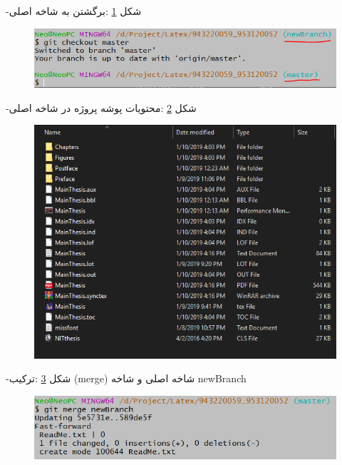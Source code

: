 -شکل \ref{n5} :برگشتن به شاخه اصلی


\begin{figure}[tbh]
	\centering
	\includegraphics[width=1\textwidth]{./Figures/n6}
	\caption{  }
	\label{n5}
\end{figure}
\newpage

-شکل \ref{n6} :محتویات پوشه پروژه در شاخه اصلی

\begin{figure}[tbh]
	\centering
	\includegraphics[width=1\textwidth]{./Figures/n7}
	\caption{  }
	\label{n6}
\end{figure}

-شکل \ref{n7} :ترکیب (merge) شاخه اصلی و شاخه newBranch
\begin{figure}[tbh]
	\centering
	\includegraphics[width=1\textwidth]{./Figures/n8}
	\caption{  }
	\label{n7}
\end{figure}
\newpage

